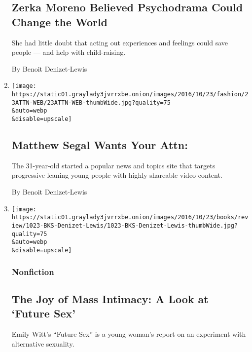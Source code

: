 \begin{enumerate}
  \hypertarget{zerka-moreno-believed-psychodrama-could-change-the-world}{%
  \subsection{Zerka Moreno Believed Psychodrama Could Change the
  World}\label{zerka-moreno-believed-psychodrama-could-change-the-world}}

  She had little doubt that acting out experiences and feelings could
  save people --- and help with child-raising.

  By Benoit Denizet-Lewis
\item
  \href{/2016/10/23/style/matthew-segal-wants-your-attn.html}{}

  \texttt{[image: https://static01.graylady3jvrrxbe.onion/images/2016/10/23/fashion/23ATTN-WEB/23ATTN-WEB-thumbWide.jpg?quality=75\\\&auto=webp\\\&disable=upscale]}

  \hypertarget{matthew-segal-wants-your-attn}{%
  \subsection{Matthew Segal Wants Your
  Attn:}\label{matthew-segal-wants-your-attn}}

  The 31-year-old started a popular news and topics site that targets
  progressive-leaning young people with highly shareable video content.

  By Benoit Denizet-Lewis
\item
  \href{/2016/10/23/books/review/future-sex-emily-witt.html}{}

  \texttt{[image: https://static01.graylady3jvrrxbe.onion/images/2016/10/23/books/review/1023-BKS-Denizet-Lewis/1023-BKS-Denizet-Lewis-thumbWide.jpg?quality=75\\\&auto=webp\\\&disable=upscale]}

  \hypertarget{nonfiction-2}{%
  \subsubsection{Nonfiction}\label{nonfiction-2}}

  \hypertarget{the-joy-of-mass-intimacy-a-look-at-future-sex}{%
  \subsection{The Joy of Mass Intimacy: A Look at `Future
  Sex'}\label{the-joy-of-mass-intimacy-a-look-at-future-sex}}

  Emily Witt's ``Future Sex'' is a young woman's report on an experiment
  with alternative sexuality.


\end{enumerate}
